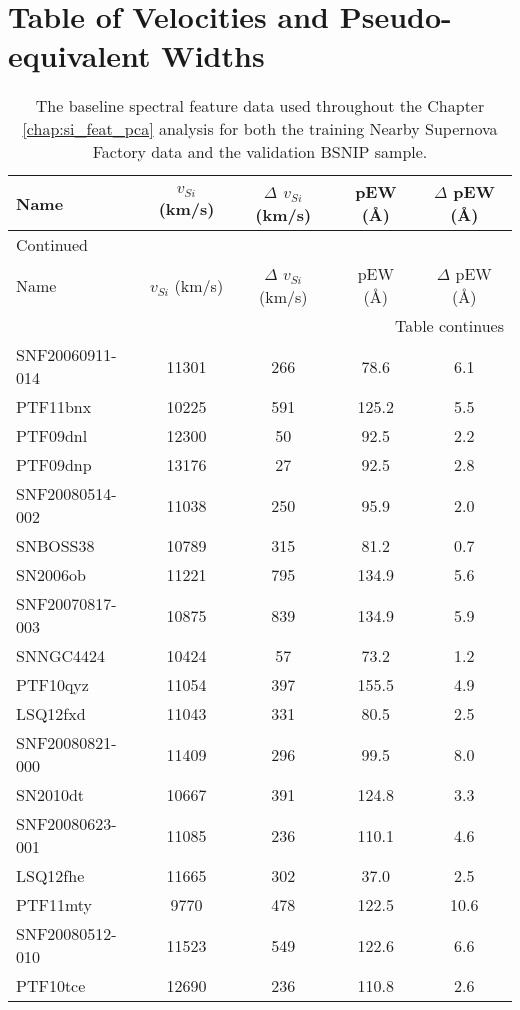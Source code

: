 \chapter{Table of \siliconii{} Velocities and Pseudo-equivalent Widths}
\label{app:snf_data_table}

\begin{longtable}{lcccc}
\caption{The baseline spectral feature data used throughout the Chapter \ref{chap:si_feat_pca} analysis for both the training Nearby Supernova Factory data and the validation BSNIP sample.} \label{snf_data_table}\\
\toprule
Name & $v_{Si}$ (km/s) & $\Delta$ $v_{Si}$ (km/s) & pEW (\AA) & $\Delta$ pEW (\AA) \\
\midrule
\endfirsthead
\multicolumn{5}{l}{Continued}\\
\toprule
Name & $v_{Si}$ (km/s) & $\Delta$ $v_{Si}$ (km/s) & pEW (\AA) & $\Delta$ pEW (\AA) \\
\midrule
\endhead
\midrule
\multicolumn{5}{r}{Table continues}\\
\midrule
\endfoot
\bottomrule
\endlastfoot
SNF20060911-014 & 11301 & 266 & 78.6 & 6.1 \\
PTF11bnx & 10225 & 591 & 125.2 & 5.5 \\
PTF09dnl & 12300 & 50 & 92.5 & 2.2 \\
PTF09dnp & 13176 & 27 & 92.5 & 2.8 \\
SNF20080514-002 & 11038 & 250 & 95.9 & 2.0 \\
SNBOSS38 & 10789 & 315 & 81.2 & 0.7 \\
SN2006ob & 11221 & 795 & 134.9 & 5.6 \\
SNF20070817-003 & 10875 & 839 & 134.9 & 5.9 \\
SNNGC4424 & 10424 & 57 & 73.2 & 1.2 \\
PTF10qyz & 11054 & 397 & 155.5 & 4.9 \\
LSQ12fxd & 11043 & 331 & 80.5 & 2.5 \\
SNF20080821-000 & 11409 & 296 & 99.5 & 8.0 \\
SN2010dt & 10667 & 391 & 124.8 & 3.3 \\
SNF20080623-001 & 11085 & 236 & 110.1 & 4.6 \\
LSQ12fhe & 11665 & 302 & 37.0 & 2.5 \\
PTF11mty & 9770 & 478 & 122.5 & 10.6 \\
SNF20080512-010 & 11523 & 549 & 122.6 & 6.6 \\
PTF10tce & 12690 & 236 & 110.8 & 2.6 \\

\end{longtable}

